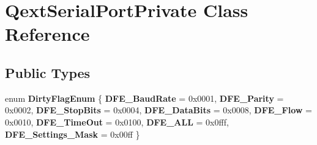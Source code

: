 \hypertarget{class_qext_serial_port_private}{}\section{Qext\+Serial\+Port\+Private Class Reference}
\label{class_qext_serial_port_private}
\subsection*{Public Types}
\begin{DoxyCompactItemize}
\item 
\mbox{\label{class_qext_serial_port_private_af6cac62914154e9db6479387f1342d4b}} 
enum {\bfseries Dirty\+Flag\+Enum} \{ \newline
{\bfseries D\+F\+E\+\_\+\+Baud\+Rate} = 0x0001, 
{\bfseries D\+F\+E\+\_\+\+Parity} = 0x0002, 
{\bfseries D\+F\+E\+\_\+\+Stop\+Bits} = 0x0004, 
{\bfseries D\+F\+E\+\_\+\+Data\+Bits} = 0x0008, 
\newline
{\bfseries D\+F\+E\+\_\+\+Flow} = 0x0010, 
{\bfseries D\+F\+E\+\_\+\+Time\+Out} = 0x0100, 
{\bfseries D\+F\+E\+\_\+\+A\+LL} = 0x0fff, 
{\bfseries D\+F\+E\+\_\+\+Settings\+\_\+\+Mask} = 0x00ff
 \}
\end{DoxyCompactItemize}
